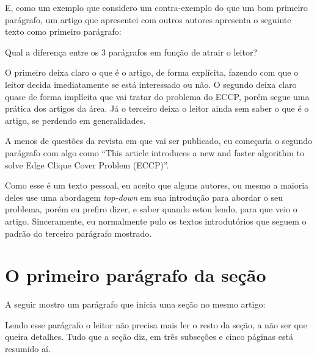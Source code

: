 \documentclass[openany]{book}
\begin{document}
E, como um exemplo que considero um contra-exemplo do que um bom primeiro parágrafo, um artigo que apresentei com outros autores apresenta o seguinte texto como primeiro parágrafo:


Qual a diferença entre os 3 parágrafos em função de atrair o leitor?

O primeiro deixa claro o que é o artigo, de forma explícita, fazendo com que o leitor decida imediatamente se está interessado ou não. O segundo deixa claro quase de forma implícita que vai tratar do problema do ECCP, porém segue uma prática dos artigos da área. Já o terceiro deixa o leitor ainda sem saber o que é o artigo, se perdendo em generalidades.

A menos de questões da revista em que vai ser publicado, eu começaria o segundo parágrafo com algo como \enquote{This article introduces a new and faster algorithm to solve Edge Clique Cover Problem (ECCP)}.

Como esse é um texto pessoal, eu aceito que alguns autores, ou mesmo a maioria deles use uma abordagem \textit{top-down} em sua introdução para abordar o seu problema, porém eu prefiro dizer, e saber quando estou lendo, para que veio o artigo. Sinceramente, eu normalmente pulo os textos introdutórios que seguem o padrão do terceiro parágrafo mostrado.

\section{O primeiro parágrafo da seção}

  A seguir mostro um parágrafo que inicia uma seção no mesmo artigo:


Lendo esse parágrafo o leitor não precisa mais ler o resto da seção, a não ser que queira detalhes. Tudo que a seção diz, em três subseções e cinco páginas está resumido aí.
\end{document}
